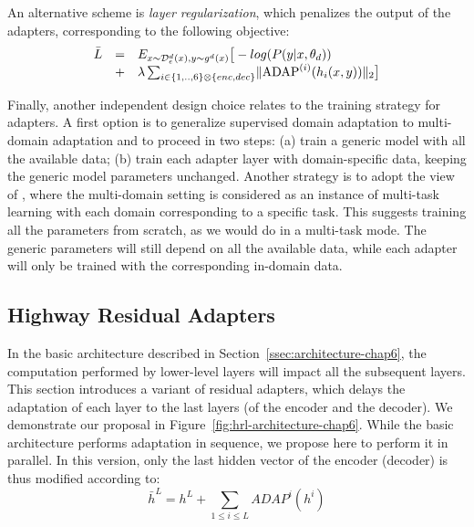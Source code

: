An alternative scheme is \emph{layer regularization}, which penalizes the output of the adapters, corresponding to the following objective:
\begin{equation*}
  \begin{array}{rcl}
    \bar{L} & = &  E_{x \sim \mathcal{D}_e^d(x), y \sim g^d(x)} \big[-log(P(y|x,\theta_d)) \\
    & + & \lambda \sum_{i \in \{1,..,6\} \otimes \{enc, dec\}} \normL{\operatorname{ADAP}^{(i)}(h_i(x,y))} \big]
  \end{array}
\end{equation*}

Finally, another independent design choice relates to the training strategy for adapters. A first option is to generalize supervised domain adaptation to multi-domain adaptation and to proceed in two steps: (a) train a generic model with all the available data; (b) train each adapter layer with domain-specific data, keeping the generic model parameters unchanged. Another strategy is to adopt the view of \citet{Dredze08online}, where the multi-domain setting is considered as an instance of multi-task learning \cite{Caruana97multitask} with each domain corresponding to a specific task. This suggests training all the parameters from scratch, as we would do in a multi-task mode. The generic parameters will still depend on all the available data, while each adapter will only be trained with the corresponding in-domain data.

\subsection{Highway Residual Adapters \label{ssec:highway-chap6}}

In the basic architecture described in Section~\ref{ssec:architecture-chap6}, the computation performed by lower-level layers will impact all the subsequent layers. This section introduces a variant of residual adapters, which delays the adaptation of each layer to the last layers (of the encoder and the decoder). We demonstrate our proposal in Figure~\ref{fig:hrl-architecture-chap6}. While the basic architecture performs adaptation in sequence, we propose here to perform it in parallel. In this version, only the last hidden vector of the encoder (decoder) is thus modified according to:
\begin{equation}
  \bar{h}^L = h^L + \displaystyle{\mathop{\sum}_{1 \leq i \leq L} ADAP^i(h^i)} \label{eq:highway-output-chap6}
\end{equation}

